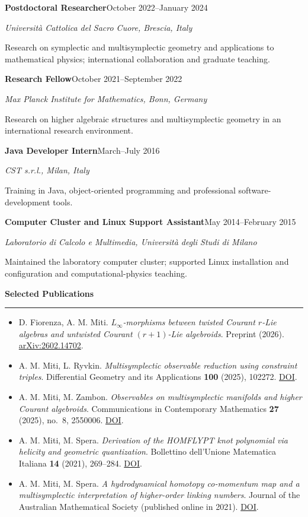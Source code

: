 \documentclass[10pt,a4paper]{article}
\newcommand{\cvsection}[1]{%
    \Needspace{4\baselineskip}%
    \vspace{0.8em}%
    {\large\bfseries\color{accent} #1}\par
    \vspace{0.2em}\hrule\vspace{0.45em}%
}
\newcommand{\entry}[4]{%
    \Needspace{4\baselineskip}%
    \textbf{#1}\hfill #2\par
    \textit{#3}\par
    #4\par\vspace{0.45em}%
}
\begin{document}
    \entry{Postdoctoral Researcher}{October 2022--January 2024}
        {Universit\`a Cattolica del Sacro Cuore, Brescia, Italy}
        {Research on symplectic and multisymplectic geometry and applications
        to mathematical physics; international collaboration and graduate teaching.}

    \entry{Research Fellow}{October 2021--September 2022}
        {Max Planck Institute for Mathematics, Bonn, Germany}
        {Research on higher algebraic structures and multisymplectic geometry
        in an international research environment.}

    \entry{Java Developer Intern}{March--July 2016}
        {CST s.r.l., Milan, Italy}
        {Training in Java, object-oriented programming and professional
        software-development tools.}

    \entry{Computer Cluster and Linux Support Assistant}{May 2014--February 2015}
        {Laboratorio di Calcolo e Multimedia, Universit\`a degli Studi di Milano}
        {Maintained the laboratory computer cluster; supported Linux
        installation and configuration and computational-physics teaching.}

    \cvsection{Selected Publications}

    \begin{itemize}[itemsep=5pt]
        \item D. Fiorenza, A. M. Miti.
            \emph{$L_\infty$-morphisms between twisted Courant $r$-Lie
            algebras and untwisted Courant $(r+1)$-Lie algebroids}.
            Preprint (2026).
            \href{https://arxiv.org/abs/2602.14702}{arXiv:2602.14702}.
        \item A. M. Miti, L. Ryvkin.
            \emph{Multisymplectic observable reduction using constraint triples}.
            Differential Geometry and its Applications \textbf{100} (2025), 102272.
            \href{https://doi.org/10.1016/j.difgeo.2025.102272}{DOI}.
        \item A. M. Miti, M. Zambon.
            \emph{Observables on multisymplectic manifolds and higher Courant
            algebroids}. Communications in Contemporary Mathematics
            \textbf{27} (2025), no.~8, 2550006.
            \href{https://doi.org/10.1142/S0219199725500063}{DOI}.
        \item A. M. Miti, M. Spera.
            \emph{Derivation of the HOMFLYPT knot polynomial via helicity
            and geometric quantization}.
            Bollettino dell'Unione Matematica Italiana \textbf{14} (2021), 269--284.
            \href{https://doi.org/10.1007/s40574-020-00254-5}{DOI}.
        \item A. M. Miti, M. Spera.
            \emph{A hydrodynamical homotopy co-momentum map and a
            multisymplectic interpretation of higher-order linking numbers}.
            Journal of the Australian Mathematical Society
            (published online in 2021).
            \href{https://doi.org/10.1017/S1446788720000518}{DOI}.
    \end{itemize}
\end{document}
